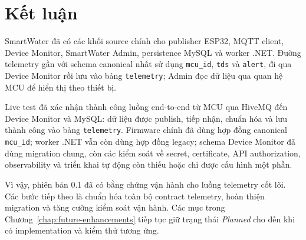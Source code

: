 \chapter{Kết luận}
\label{chap:conclusion}

SmartWater đã có các khối source chính cho publisher ESP32, MQTT client, Device Monitor,
SmartWater Admin, persistence MySQL và worker .NET. Đường telemetry gần với schema
canonical nhất sử dụng \texttt{mcu\_id}, \texttt{tds} và \texttt{alert}, đi qua
Device Monitor rồi lưu vào bảng \texttt{telemetry}; Admin đọc dữ liệu qua quan hệ MCU
để hiển thị theo thiết bị.

Live test đã xác nhận thành công luồng end-to-end từ MCU qua HiveMQ đến Device Monitor
và MySQL: dữ liệu được publish, tiếp nhận, chuẩn hóa và lưu thành công vào bảng
\texttt{telemetry}. Firmware chính đã dùng hợp đồng canonical \texttt{mcu\_id}; worker .NET vẫn còn dùng hợp đồng legacy; schema
Device Monitor đã dùng migration chung, còn các kiểm soát về secret, certificate,
API authorization, observability và triển khai tự động còn thiếu hoặc chỉ được cấu hình
một phần.

Vì vậy, phiên bản 0.1 đã có bằng chứng vận hành cho luồng telemetry cốt lõi. Các bước
tiếp theo là chuẩn hóa toàn bộ contract telemetry, hoàn thiện migration và tăng cường
kiểm soát vận hành. Các mục trong Chương~\ref{chap:future-enhancements} tiếp tục giữ
trạng thái \textit{Planned} cho đến khi có implementation và kiểm thử tương ứng.
